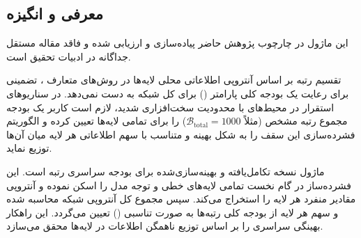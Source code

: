 \subsection{معرفی و انگیزه}
این ماژول در چارچوب پژوهش حاضر پیاده‌سازی و ارزیابی شده و فاقد مقاله مستقل جداگانه در ادبیات تحقیق است.

تقسیم رتبه بر اساس آنتروپی اطلاعاتی محلی لایه‌ها در روش‌های متعارف ، تضمینی برای رعایت یک بودجه کلی پارامتر () برای کل شبکه به دست نمی‌دهد. در سناریوهای استقرار در محیط‌های با محدودیت سخت‌افزاری شدید، لازم است کاربر یک بودجه مجموع رتبه مشخص (مثلاً $\mathcal{B}_{\text{total}} = 1000$) را برای تمامی لایه‌ها تعیین کرده و الگوریتم فشرده‌سازی این سقف را به شکل بهینه و متناسب با سهم اطلاعاتی هر لایه میان آن‌ها توزیع نماید.

ماژول  نسخه تکامل‌یافته و بهینه‌سازی‌شده برای بودجه سراسری رتبه است. این فشرده‌ساز در گام نخست تمامی لایه‌های خطی و توجه مدل را اسکن نموده و آنتروپی مقادیر منفرد هر لایه را استخراج می‌کند. سپس مجموع کل آنتروپی شبکه محاسبه شده و سهم هر لایه از بودجه کلی رتبه‌ها به صورت تناسبی () تعیین می‌گردد. این راهکار بهینگی سراسری را بر اساس توزیع ناهمگن اطلاعات در لایه‌ها محقق می‌سازد.

